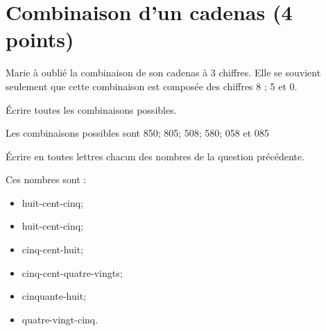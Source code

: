 \section{Combinaison d'un cadenas (4 points)}


Marie à oublié la combinaison de son cadenas à 3 chiffres. Elle se souvient seulement que cette combinaison est composée des chiffres 8 ; 5 et 0.

\begin{questions}
	\question[2] \'Ecrire toutes les combinaisons possibles.
	\begin{solution}
		Les combinaisons possibles sont 850; 805; 508; 580; 058 et 085
	\end{solution}
	\question[2] \'Ecrire en toutes lettres chacun des nombres de la question précédente.
	\begin{solution}
		Ces nombres sont :
		\begin{itemize}
			\item huit-cent-cinq;
			\item huit-cent-cinq;
			\item cinq-cent-huit;
			\item cinq-cent-quatre-vingts;
			\item cinquante-huit;
			\item quatre-vingt-cinq.
		\end{itemize}
	\end{solution}
\end{questions}